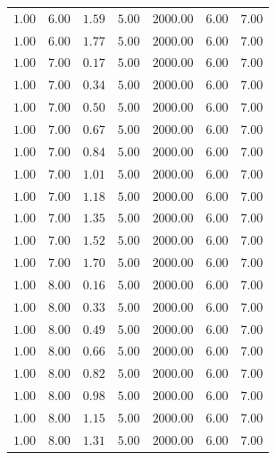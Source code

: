\begin{longtable}[c]{lllllll}
   $1.00$  & $6.00$  & $1.59$   & $5.00$ & $2000.00$ & $6.00$               & $7.00$      \\
   $1.00$  & $6.00$  & $1.77$   & $5.00$ & $2000.00$ & $6.00$               & $7.00$      \\
   $1.00$  & $7.00$  & $0.17$   & $5.00$ & $2000.00$ & $6.00$               & $7.00$      \\
   $1.00$  & $7.00$  & $0.34$   & $5.00$ & $2000.00$ & $6.00$               & $7.00$      \\
   $1.00$  & $7.00$  & $0.50$   & $5.00$ & $2000.00$ & $6.00$               & $7.00$      \\
   $1.00$  & $7.00$  & $0.67$   & $5.00$ & $2000.00$ & $6.00$               & $7.00$      \\
   $1.00$  & $7.00$  & $0.84$   & $5.00$ & $2000.00$ & $6.00$               & $7.00$      \\
   $1.00$  & $7.00$  & $1.01$   & $5.00$ & $2000.00$ & $6.00$               & $7.00$      \\
   $1.00$  & $7.00$  & $1.18$   & $5.00$ & $2000.00$ & $6.00$               & $7.00$      \\
   $1.00$  & $7.00$  & $1.35$   & $5.00$ & $2000.00$ & $6.00$               & $7.00$      \\
   $1.00$  & $7.00$  & $1.52$   & $5.00$ & $2000.00$ & $6.00$               & $7.00$      \\
   $1.00$  & $7.00$  & $1.70$   & $5.00$ & $2000.00$ & $6.00$               & $7.00$      \\
   $1.00$  & $8.00$  & $0.16$   & $5.00$ & $2000.00$ & $6.00$               & $7.00$      \\
   $1.00$  & $8.00$  & $0.33$   & $5.00$ & $2000.00$ & $6.00$               & $7.00$      \\
   $1.00$  & $8.00$  & $0.49$   & $5.00$ & $2000.00$ & $6.00$               & $7.00$      \\
   $1.00$  & $8.00$  & $0.66$   & $5.00$ & $2000.00$ & $6.00$               & $7.00$      \\
   $1.00$  & $8.00$  & $0.82$   & $5.00$ & $2000.00$ & $6.00$               & $7.00$      \\
   $1.00$  & $8.00$  & $0.98$   & $5.00$ & $2000.00$ & $6.00$               & $7.00$      \\
   $1.00$  & $8.00$  & $1.15$   & $5.00$ & $2000.00$ & $6.00$               & $7.00$      \\
   $1.00$  & $8.00$  & $1.31$   & $5.00$ & $2000.00$ & $6.00$               & $7.00$      \\

\end{longtable}
